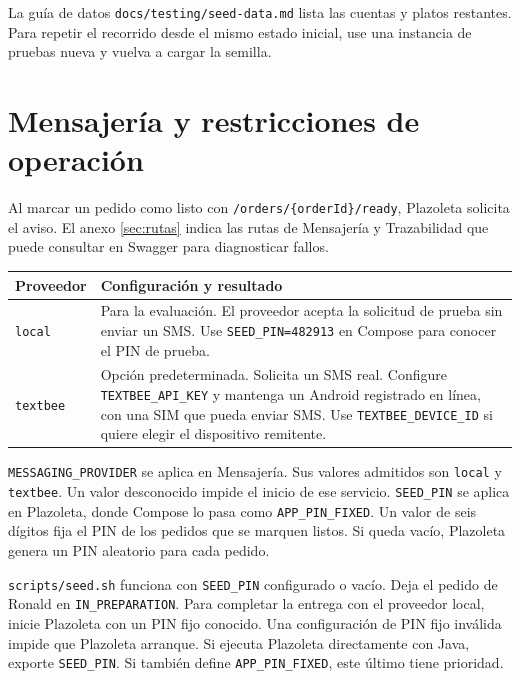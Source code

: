 \documentclass[11pt,a4paper]{article}
\newcommand{\code}[1]{\nolinkurl{#1}}
\begin{document}
La guía de datos \code{docs/testing/seed-data.md} lista las cuentas y platos restantes. Para repetir el recorrido desde el mismo estado inicial, use una instancia de pruebas nueva y vuelva a cargar la semilla.

\clearpage
\section{Mensajería y restricciones de operación}\label{sec:sms}
Al marcar un pedido como listo con \code{/orders/{orderId}/ready}, Plazoleta solicita el aviso. El anexo \ref{sec:rutas} indica las rutas de Mensajería y Trazabilidad que puede consultar en Swagger para diagnosticar fallos.

\begin{minipage}{\linewidth}
\begin{tabularx}{\linewidth}{@{}P{27mm}Y@{}}
\toprule
Proveedor & Configuración y resultado \\
\midrule
\code{local} & Para la evaluación. El proveedor acepta la solicitud de prueba sin enviar un SMS. Use \code{SEED_PIN=482913} en Compose para conocer el PIN de prueba. \\
\code{textbee} & Opción predeterminada. Solicita un SMS real. Configure \code{TEXTBEE_API_KEY} y mantenga un Android registrado en línea, con una SIM que pueda enviar SMS. Use \code{TEXTBEE_DEVICE_ID} si quiere elegir el dispositivo remitente. \\
\bottomrule
\end{tabularx}
\end{minipage}

\code{MESSAGING_PROVIDER} se aplica en Mensajería. Sus valores admitidos son \code{local} y \code{textbee}. Un valor desconocido impide el inicio de ese servicio. \code{SEED_PIN} se aplica en Plazoleta, donde Compose lo pasa como \code{APP_PIN_FIXED}. Un valor de seis dígitos fija el PIN de los pedidos que se marquen listos. Si queda vacío, Plazoleta genera un PIN aleatorio para cada pedido.

\code{scripts/seed.sh} funciona con \code{SEED_PIN} configurado o vacío. Deja el pedido de Ronald en \code{IN_PREPARATION}. Para completar la entrega con el proveedor local, inicie Plazoleta con un PIN fijo conocido. Una configuración de PIN fijo inválida impide que Plazoleta arranque. Si ejecuta Plazoleta directamente con Java, exporte \code{SEED_PIN}. Si también define \code{APP_PIN_FIXED}, este último tiene prioridad.
\end{document}
